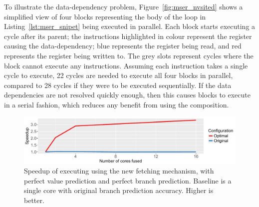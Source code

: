 
To illustrate the data-dependency problem, Figure~\ref{fig:mser_nvsited} shows a simplified view of four blocks representing the body of the loop in Listing~\ref{lst:mser_snipet} being executed in parallel.
Each block starts executing a cycle after its parent; the instructions highlighted in colour represent the register causing the data-dependency; blue represents the register being read, and red represents the register being written to.
The grey slots represent cycles where the block cannot execute any instructions.
Assuming each instruction takes a single cycle to execute, 22 cycles are needed to execute all four blocks in parallel, compared to 28 cycles if they were to be executed sequentially.
If the data dependencies are not resolved quickly enough, then this causes blocks to execute in a serial fashion, which reduces any benefit from using the composition.

\begin{figure}[t]
    \centering
    \includegraphics[width=1\textwidth]{chapter3/graphics/mser_motiv_reg2.pdf}
    \caption{Speedup of executing  using the new fetching mechanism, with perfect value prediction and perfect branch prediction. Baseline is a single core with original branch prediction accuracy. Higher is better.}
    \label{fig:motivation_reg}
	\vspace{1em}
\end{figure}


